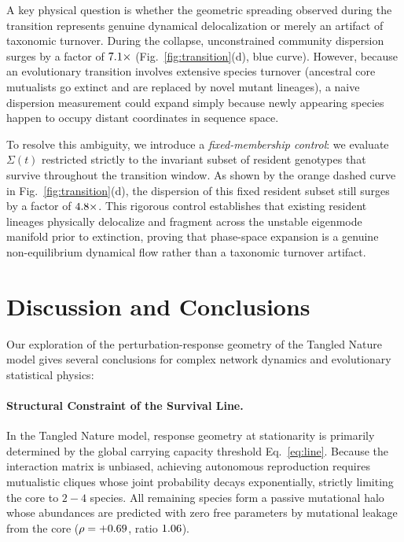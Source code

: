\documentclass[twocolumn,amsmath,amssymb,aps,pra,10pt,floatfix,nofootinbib]{revtex4-2}
\begin{document}
A key physical question is whether the geometric spreading observed during the transition represents genuine dynamical delocalization or merely an artifact of taxonomic turnover. During the collapse, unconstrained community dispersion surges by a factor of $7.1\times$ (Fig.~\ref{fig:transition}(d), blue curve). However, because an evolutionary transition involves extensive species turnover (ancestral core mutualists go extinct and are replaced by novel mutant lineages), a naive dispersion measurement could expand simply because newly appearing species happen to occupy distant coordinates in sequence space.

To resolve this ambiguity, we introduce a \textit{fixed-membership control}: we evaluate $\Sigma(t)$ restricted strictly to the invariant subset of resident genotypes that survive throughout the transition window. As shown by the orange dashed curve in Fig.~\ref{fig:transition}(d), the dispersion of this fixed resident subset still surges by a factor of $4.8\times$. This rigorous control establishes that existing resident lineages physically delocalize and fragment across the unstable eigenmode manifold prior to extinction, proving that phase-space expansion is a genuine non-equilibrium dynamical flow rather than a taxonomic turnover artifact.

\section{Discussion and Conclusions}
\label{sec:discussion}

Our exploration of the perturbation-response geometry of the Tangled Nature model gives several conclusions for complex network dynamics and evolutionary statistical physics:

\paragraph{Structural Constraint of the Survival Line.} In the Tangled Nature model, response geometry at stationarity is primarily determined by the global carrying capacity threshold Eq.~\eqref{eq:line}. Because the interaction matrix is unbiased, achieving autonomous reproduction requires mutualistic cliques whose joint probability decays exponentially, strictly limiting the core to $2 - 4$ species. All remaining species form a passive mutational halo whose abundances are predicted with zero free parameters by mutational leakage from the core ($\rho = +0.69$, ratio $1.06$).
\end{document}

